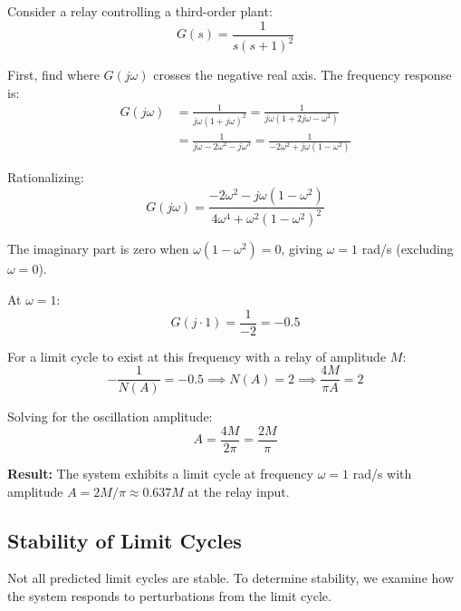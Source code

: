 \begin{example}
\label{ex:limit_cycle_third_order}
Consider a relay controlling a third-order plant:
\begin{equation}
G(s) = \frac{1}{s(s+1)^2}
\end{equation}

First, find where $G(j\omega)$ crosses the negative real axis. The frequency response is:
\begin{align}
G(j\omega) &= \frac{1}{j\omega(1+j\omega)^2} = \frac{1}{j\omega(1 + 2j\omega - \omega^2)} \\
&= \frac{1}{j\omega - 2\omega^2 - j\omega^3} = \frac{1}{-2\omega^2 + j\omega(1-\omega^2)}
\end{align}

Rationalizing:
\begin{equation}
G(j\omega) = \frac{-2\omega^2 - j\omega(1-\omega^2)}{4\omega^4 + \omega^2(1-\omega^2)^2}
\end{equation}

The imaginary part is zero when $\omega(1-\omega^2) = 0$, giving $\omega = 1$ rad/s (excluding $\omega = 0$).

At $\omega = 1$:
\begin{equation}
G(j\cdot 1) = \frac{1}{-2} = -0.5
\end{equation}

For a limit cycle to exist at this frequency with a relay of amplitude $M$:
\begin{equation}
-\frac{1}{N(A)} = -0.5 \implies N(A) = 2 \implies \frac{4M}{\pi A} = 2
\end{equation}

Solving for the oscillation amplitude:
\begin{equation}
A = \frac{4M}{2\pi} = \frac{2M}{\pi}
\end{equation}

\textbf{Result:} The system exhibits a limit cycle at frequency $\omega = 1$ rad/s with amplitude $A = 2M/\pi \approx 0.637M$ at the relay input.
\end{example}

\subsection{Stability of Limit Cycles}

Not all predicted limit cycles are stable. To determine stability, we examine how the system responds to perturbations from the limit cycle.

